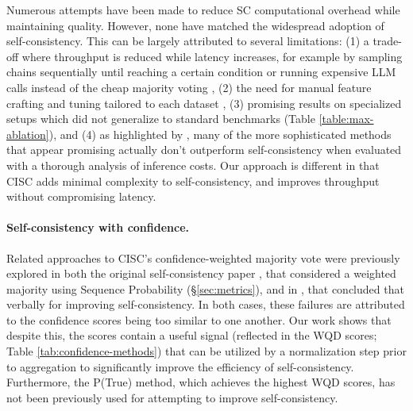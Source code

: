 Numerous attempts \cite{chen-etal-2024-self-para} have been made to reduce SC computational overhead while maintaining quality. However, none have matched the widespread adoption of self-consistency. This can be largely attributed to several limitations: (1) a trade-off where throughput is reduced while latency increases, for example by sampling chains sequentially until reaching a certain condition \cite{li2024escape} or running expensive LLM calls instead of the cheap majority voting \cite{yoran2023answering}, (2) the need for manual feature crafting and tuning tailored to each dataset \cite{wan2024dynamic}, (3) promising results on specialized setups \cite{wang2024soft} which did not generalize to standard benchmarks (Table \ref{table:max-ablation}), and (4) as highlighted by \citet{huang2023large}, many of the more sophisticated methods that appear promising actually don't outperform self-consistency when evaluated with a thorough analysis of inference costs. Our approach is different in that CISC adds minimal complexity to self-consistency, and improves throughput without compromising latency.

\paragraph{Self-consistency with confidence.}
Related approaches to CISC's confidence-weighted majority vote were previously explored in both the original self-consistency paper \citet{wang2022self}, that considered a weighted majority using Sequence Probability (\S\ref{sec:metrics}), and in \citet{miao2023selfcheck}, that concluded that verbally  for improving self-consistency. In both cases, these failures are attributed to the confidence scores being too similar to one another. Our work shows that despite this, the scores contain a useful signal (reflected in the WQD scores; Table \ref{tab:confidence-methods}) that can be utilized by a normalization step prior to aggregation to significantly improve the efficiency of self-consistency. Furthermore, the P(True) method, which achieves the highest WQD scores, has not been previously used for attempting to improve self-consistency.


